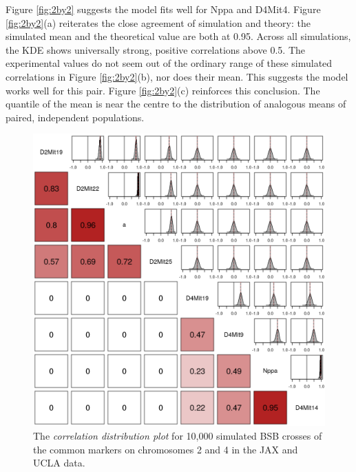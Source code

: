 \documentclass[12pt]{article}
\begin{document}
Figure \ref{fig:2by2} suggests the model fits well for Nppa and D4Mit4. Figure \ref{fig:2by2}(a) reiterates the close agreement of simulation and theory: the simulated mean and the theoretical value are both at 0.95. Across all simulations, the KDE shows universally strong, positive correlations above 0.5. The experimental values do not seem out of the ordinary range of these simulated correlations in Figure \ref{fig:2by2}(b), nor does their mean. This suggests the model works well for this pair. Figure \ref{fig:2by2}(c) reinforces this conclusion. The quantile of the mean is near the centre to the distribution of analogous means of paired, independent populations.

\begin{figure}[h]
  \begin{center}
      \includegraphics[scale = 0.5]{../img/bsbCorrDist.png}
  \end{center}
  \caption{The \emph{correlation distribution plot} for 10,000 simulated BSB crosses of the common markers on chromosomes 2 and 4 in the JAX and UCLA data.}
  \label{fig:bsbcorrDist}
\end{figure}
\end{document}

